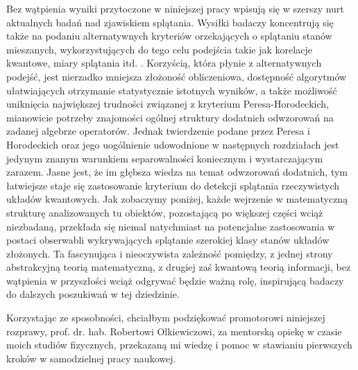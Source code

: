 Bez wątpienia wyniki przytoczone w niniejszej pracy wpisują się w szerszy nurt
aktualnych badań nad zjawiskiem splątania.
Wysiłki badaczy koncentrują się także na podaniu alternatywnych kryteriów
orzekających o splątaniu stanów mieszanych,
wykorzystujących do tego celu podejścia takie jak korelacje kwantowe,
miary splątania itd.
\cite{modi2010unified,ollivier2001quantum}.
Korzyścią, która płynie z alternatywnych podejść,
jest nierzadko mniejsza złożoność obliczeniowa,
dostępność algorytmów ułatwiających otrzymanie statystycznie istotnych wyników,
a także możliwość uniknięcia największej trudności związanej z kryterium
Peresa-Horodeckich,
mianowicie potrzeby znajomości ogólnej struktury dodatnich odwzorowań
na zadanej algebrze operatorów.
Jednak twierdzenie podane przez Peresa i Horodeckich oraz
jego uogólnienie udowodnione w następnych rozdziałach
jest jedynym znanym warunkiem separowalności
koniecznym i wystarczającym zarazem.
Jasne jest,
że im głębsza wiedza na temat odwzorowań dodatnich,
tym łatwiejsze staje się zastosowanie kryterium do detekcji splątania
rzeczywistych układów kwantowych.
Jak zobaczymy poniżej,
każde wejrzenie w matematyczną strukturę analizowanych tu obiektów,
pozostającą po większej części wciąż niezbadaną,
przekłada się niemal natychmiast na potencjalne zastosowania w postaci
obserwabli wykrywających splątanie szerokiej klasy stanów układów złożonych.
Ta fascynująca i nieoczywista zależność pomiędzy,
z jednej strony abstrakcyjną teorią matematyczną,
z drugiej zaś kwantową teorią informacji,
bez wątpienia w przyszłości wciąż odgrywać będzie ważną rolę,
inspirującą badaczy do dalszych poszukiwań w tej dziedzinie.

\vspace{0.5cm}
Korzystając ze sposobności,
chciałbym podziękować promotorowi niniejszej rozprawy,
prof. dr. hab. Robertowi Olkiewiczowi,
za mentorską opiekę w czasie moich studiów fizycznych,
przekazaną mi wiedzę i pomoc w stawianiu pierwszych kroków
w samodzielnej pracy naukowej.

